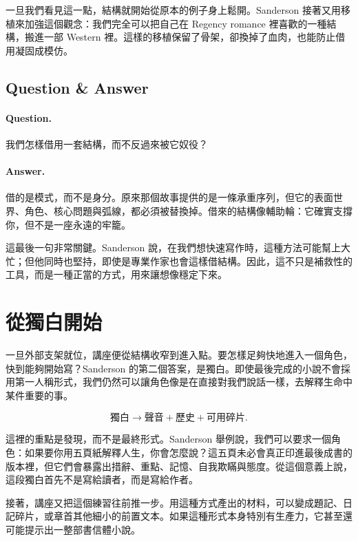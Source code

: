 一旦我們看見這一點，結構就開始從原本的例子身上鬆開。Sanderson 接著又用移植來加強這個觀念：我們完全可以把自己在 Regency romance 裡喜歡的一種結構，搬進一部 Western 裡。這樣的移植保留了骨架，卻換掉了血肉，也能防止借用凝固成模仿。

\subsection{Question \& Answer}

\paragraph{Question.} 我們怎樣借用一套結構，而不反過來被它奴役？

\paragraph{Answer.} 借的是模式，而不是身分。原來那個故事提供的是一條承重序列，但它的表面世界、角色、核心問題與弧線，都必須被替換掉。借來的結構像輔助輪：它確實支撐你，但不是一座永遠的牢籠。

這最後一句非常關鍵。Sanderson 說，在我們想快速寫作時，這種方法可能幫上大忙；但他同時也堅持，即使是專業作家也會這樣借結構。因此，這不只是補救性的工具，而是一種正當的方式，用來讓想像穩定下來。

\section{從獨白開始}

一旦外部支架就位，講座便從結構收窄到進入點。要怎樣足夠快地進入一個角色，快到能夠開始寫？Sanderson 的第二個答案，是獨白。即使最後完成的小說不會採用第一人稱形式，我們仍然可以讓角色像是在直接對我們說話一樣，去解釋生命中某件重要的事。

\begin{equation}
\text{獨白} \to \text{聲音} + \text{歷史} + \text{可用碎片}.
\end{equation}

這裡的重點是發現，而不是最終形式。Sanderson 舉例說，我們可以要求一個角色：如果要你用五頁紙解釋人生，你會怎麼說？這五頁未必會真正印進最後成書的版本裡，但它們會暴露出措辭、重點、記憶、自我欺瞞與態度。從這個意義上說，這段獨白首先不是寫給讀者，而是寫給作者。

接著，講座又把這個練習往前推一步。用這種方式產出的材料，可以變成題記、日記碎片，或章首其他細小的前置文本。如果這種形式本身特別有生產力，它甚至還可能提示出一整部書信體小說。

